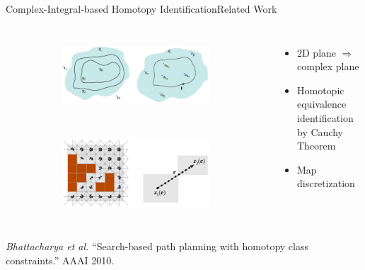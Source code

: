 \begin{frame}{Complex-Integral-based Homotopy Identification}{Related Work}

\begin{columns}
\begin{figure}
\begin{subfigure}
	\centering
	\includegraphics[width=\linewidth]{figure/cauchy_theorem}
\end{subfigure}
\\
\begin{subfigure}
	\centering
	\includegraphics[width=\linewidth]{figure/cauchy_theorem2}
\end{subfigure}
\end{figure}

\begin{itemize}
\item 2D plane $ \Rightarrow $ complex plane
\item Homotopic equivalence identification by Cauchy Theorem
\item Map discretization
\end{itemize}
\end{columns}

\tiny{ {\it Bhattacharya et al.} ``Search-based path planning with homotopy class constraints.'' AAAI 2010. }

\end{frame}


